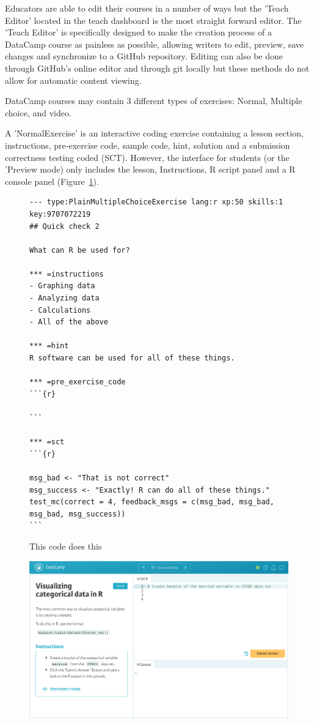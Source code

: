 \documentclass[12pt]{article}
\begin{document}
Educators are able to edit their courses in a number of ways but the 'Teach Editor' located in the teach dashboard is the
most straight forward editor. The 'Teach Editor' is specifically designed to make the creation process of a DataCamp course
as painless as possible, allowing writers to edit, preview, save changes and synchronize to a GitHub repository. Editing can
also be done through GitHub's online editor and through git locally but these methods do not allow for automatic content
viewing.



DataCamp courses may contain 3 different types of exercises: Normal, Multiple choice, and video.

A 'NormalExercise' is an interactive coding exercise containing a lesson section, instructions, pre-exercise code, sample
code, hint, solution and a submission correctness testing coded (SCT). However, the interface for students (or the 'Preview
mode) only includes the lesson, Instructions, R script panel and a R console panel (Figure~\ref{fig:code1}).


\begin{figure}
\caption{This code does this}
\begin{Verbatim}[frame=single]
--- type:PlainMultipleChoiceExercise lang:r xp:50 skills:1 key:9707072219
## Quick check 2

What can R be used for?

*** =instructions
- Graphing data
- Analyzing data
- Calculations
- All of the above

*** =hint
R software can be used for all of these things.

*** =pre_exercise_code
```{r}

```

*** =sct
```{r}

msg_bad <- "That is not correct"
msg_success <- "Exactly! R can do all of these things."
test_mc(correct = 4, feedback_msgs = c(msg_bad, msg_bad, msg_bad, msg_success))
```
\end{Verbatim}
\label{fig:code1}
\end{figure}

\begin{figure}[h]
  \includegraphics[scale = 0.19] {preview.jpg}
\end{figure}
\end{document}
